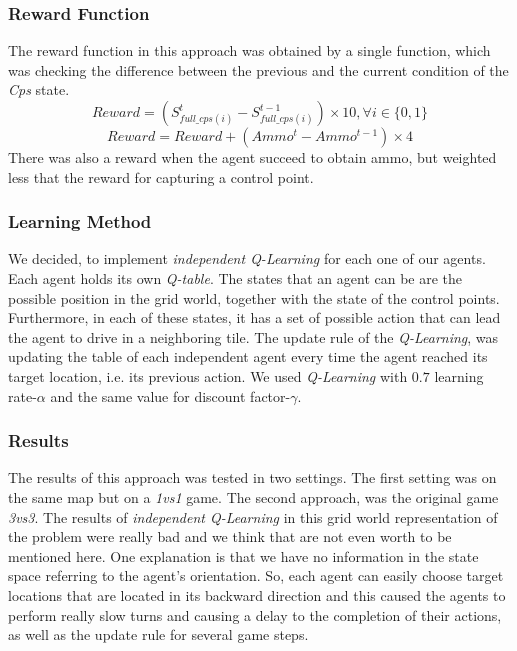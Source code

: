 \documentclass[conference]{IEEEtran}
\begin{document}
\subsubsection{Reward Function}
The reward function in this approach was obtained by a single function, which was checking the difference between the previous and the current condition of the \textit{Cps} state.
\begin{equation}
Reward = (S^{t}_{full\_cps(i)} - S^{t-1}_{full\_cps(i)}) \times 10, \forall i \in \lbrace 0,1 \rbrace
\end{equation}
\begin{equation}
Reward = Reward + (Ammo^{t} - Ammo^{t-1}) \times 4
\end{equation}
There was also a reward when the agent succeed to obtain ammo, but weighted less that the reward for capturing a control point.

\subsubsection{Learning Method}
We decided, to implement \textit{independent Q-Learning} for each one of our agents. Each agent holds its own \textit{Q-table}. The states that an agent can be are the possible position in the grid world, together with the state of the control points. Furthermore, in each of these states, it has a set of possible action that can lead the agent to drive in a neighboring tile. The update rule of the \textit{Q-Learning}, was updating the table of each independent agent every time the agent reached its target location, i.e. its previous action. We used \textit{Q-Learning} with $0.7$ learning rate-$\alpha$ and the same value for discount factor-$\gamma$.

\subsubsection{Results}
The results of this approach was tested in two settings. The first setting was on the same map but on a \emph{1vs1} game. The second approach, was the original game \emph{3vs3}. The results of \textit{independent Q-Learning} in this grid world representation of the problem were really bad and we think that are not even worth to be mentioned here. One explanation is that we have no information in the state space referring to the agent's orientation. So, each agent can easily choose target locations that are located in its backward direction and this caused the agents to perform really slow turns and causing a delay to the completion of their actions, as well as the update rule for several game steps.
\end{document}
